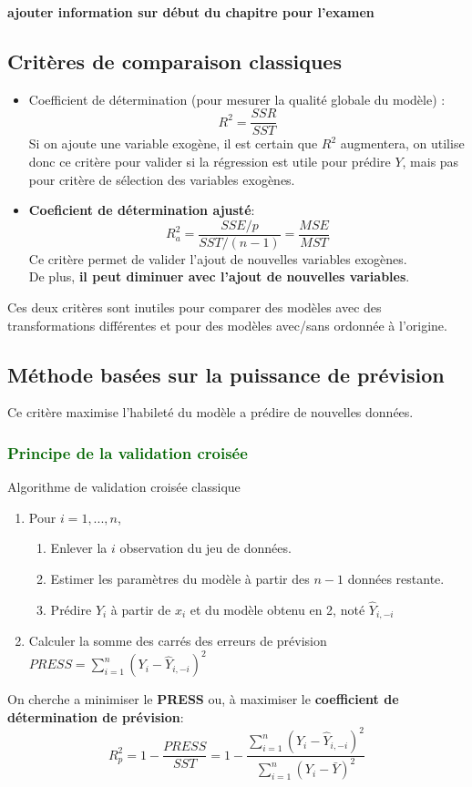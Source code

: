 \documentclass[10pt, french]{article}
\begin{document}
\begin{multicols*}{3}
\textbf{ajouter information sur début du chapitre pour l'examen}

\subsection*{Critères de comparaison classiques}
\begin{itemize}
	\item Coefficient de détermination (pour mesurer la qualité globale du modèle) :
	\[ R^2 = \frac{SSR}{SST} \]
	Si on ajoute une variable exogène, il est certain que $R^2$ augmentera, on utilise donc ce critère pour valider si la régression est utile pour prédire $Y$, mais pas pour critère de sélection des variables exogènes.
	\item \textbf{Coeficient de détermination ajusté}:
	\[ R_a^2 = \frac{SSE / p}{SST / (n-1)} = \frac{MSE}{MST} \]
	Ce critère permet de valider l'ajout de nouvelles variables exogènes.\\ 
	De plus, \textbf{il peut diminuer avec l'ajout de nouvelles variables}.
\end{itemize}
Ces deux critères sont inutiles pour comparer des modèles avec des transformations différentes et pour des modèles avec/sans ordonnée à l'origine.

\subsection*{Méthode basées sur la puissance de prévision}
Ce critère maximise l'habileté du modèle a prédire de nouvelles données.

\subsubsection*{\textcolor{darkgreen}{Principe de la validation croisée}}

\begin{algo}{Algorithme de validation croisée classique}
\begin{enumerate}
\item Pour $i = 1, ..., n$,
\begin{enumerate}[label=1.\arabic*]
	\item Enlever la $i$ observation du jeu de données.
	\item Estimer les paramètres du modèle à partir des $n - 1$ données restante.
	\item Prédire $Y_i$ à partir de $x_i$ et du modèle obtenu en 2, noté $\hat{Y}_{i,-i}$
\end{enumerate}
\item Calculer la somme des carrés des erreurs de prévision $PRESS = \sum_{i=1}^n (Y_i - \hat{Y}_{i,-i})^2$
\end{enumerate}
\end{algo}
	On cherche a minimiser le \textbf{PRESS} ou, à maximiser le \textbf{coefficient de détermination de prévision}:
	\[ R_p^2 = 1 - \frac{PRESS}{SST} = 1 - \frac{\sum_{i=1}^n (Y_i - \hat{Y}_{i,-i})^2}{\sum_{i=1}^n (Y_i - \bar{Y})^2}\]

\end{multicols*}
\end{document}
